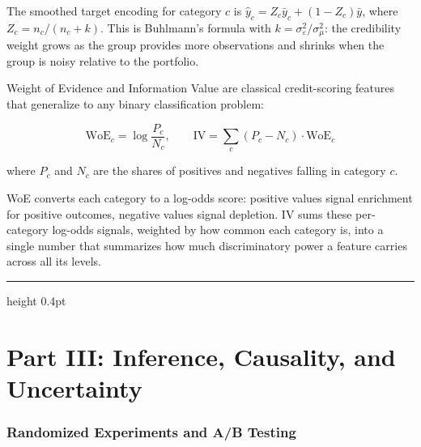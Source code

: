 \documentclass[12pt,a4paper]{article}
\begin{document}
\begin{analogy}
The smoothed target encoding for category $c$ is
$\hat{y}_c = Z_c\bar{y}_c + (1-Z_c)\bar{y}$, where
$Z_c = n_c/(n_c + k)$. This is Buhlmann's formula with
$k = \sigma^2_\varepsilon/\sigma^2_\mu$: the credibility weight grows as
the group provides more observations and shrinks when the group is noisy
relative to the portfolio.
\end{analogy}

Weight of Evidence and Information Value are classical credit-scoring
features that generalize to any binary classification problem:

\begin{equation*}
  \mathrm{WoE}_c = \log\frac{P_c}{N_c},
  \qquad
  \mathrm{IV} = \sum_c (P_c - N_c)\cdot\mathrm{WoE}_c
\end{equation*}

where $P_c$ and $N_c$ are the shares of positives and negatives
falling in category $c$.

\begin{mentalmodel}
WoE converts each category to a log-odds score: positive values signal
enrichment for positive outcomes, negative values signal depletion. IV
sums these per-category log-odds signals, weighted by how common each
category is, into a single number that summarizes how much discriminatory
power a feature carries across all its levels.
\end{mentalmodel}

\vspace{10pt}\hrule height 0.4pt\vspace{14pt}

\part*{Part III: Inference, Causality, and Uncertainty}

\section*{Randomized Experiments and A/B Testing}
\end{document}
